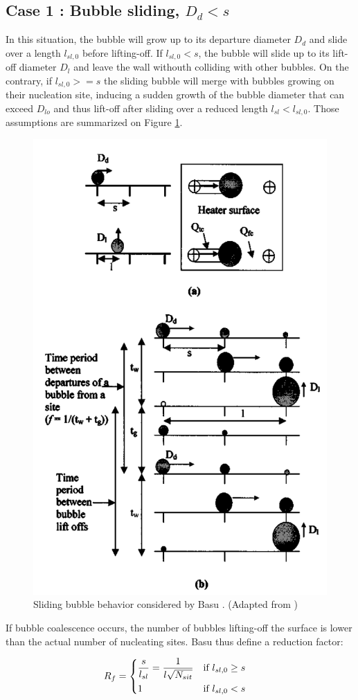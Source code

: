 \subsection{Case 1 : Bubble sliding, $D_{d}<s$}

In this situation, the bubble will grow up to its departure diameter $D_{d}$ and slide over a length $l_{sl,0}$ before lifting-off. If $l_{sl,0}<s$, the bubble will slide up to its lift-off diameter $D_{l}$ and leave the wall withouth colliding with other bubbles. On the contrary, if $l_{sl,0}>=s$ the sliding bubble will merge with bubbles growing on their nucleation site, inducing a sudden growth of the bubble diameter that can exceed $D_{lo}$ and thus lift-off after sliding over a reduced length $l_{sl}<l_{sl,0}$. Those assumptions are summarized on Figure \ref{fig:Basu_sliding}.

\begin{figure}[h]
\centering
\includegraphics[width=0.5\linewidth]{img/HFP/Basu/slide.PNG}
\caption{Sliding bubble behavior considered by Basu \etal. (Adapted from \cite{Basu2005})}
\label{fig:Basu_sliding}
\end{figure}
	

If bubble coalescence occurs, the number of bubbles lifting-off the surface is lower than the actual number of nucleating sites. Basu \etal thus define a reduction factor:

\begin{align}
R_{f}&=
\begin{dcases}
\dfrac{s}{l_{sl}} = \dfrac{1}{l\sqrt{N_{sit}}} & \text{if } l_{sl,0} \geq s \\
1 & \text{if } l_{sl,0}<s
\end{dcases}
\label{eq:HFP_B_Rf}
\end{align}  


